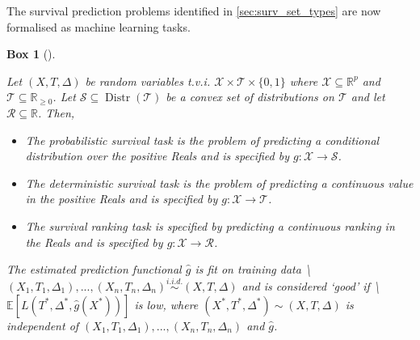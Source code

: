 \documentclass[
  letterpaper,
]{scrbook}
\providecommand{\tightlist}{%
  \setlength{\itemsep}{0pt}\setlength{\parskip}{0pt}}\usepackage{longtable,booktabs,array}
\theoremstyle{plain}
\newtheorem{conjecture}{Box}[chapter]
\theoremstyle{definition}
\theoremstyle{remark}
\begin{document}
The survival prediction problems identified in \ref{sec:surv_set_types}
are now formalised as machine learning tasks.

\begin{tcolorbox}[enhanced jigsaw, title={Survival Task}, breakable, leftrule=.75mm, rightrule=.15mm, opacityback=0, coltitle=black, colback=white, toptitle=1mm, toprule=.15mm, bottomtitle=1mm, titlerule=0mm, arc=.35mm, bottomrule=.15mm, colbacktitle=quarto-callout-note-color!10!white, left=2mm, opacitybacktitle=0.6, colframe=quarto-callout-note-color-frame]

\leavevmode{}%
\begin{conjecture}[]\label{cnj-task-surv}

Let \((X,T,\Delta)\) be random variables t.v.i.
\(\mathcal{X}\times \mathcal{T}\times \{0,1\}\) where
\(\mathcal{X}\subseteq \mathbb{R}^p\) and
\(\mathcal{T}\subseteq \mathbb{R}_{\geq 0}\). Let
\(\mathcal{S}\subseteq \ensuremath{\operatorname{Distr}(\mathcal{T})}\)
be a convex set of distributions on \(\mathcal{T}\) and let
\(\mathcal{R}\subseteq \mathbb{R}\). Then,

\begin{itemize}
\tightlist
\item
  The \emph{probabilistic survival task} is the problem of predicting a
  conditional distribution over the positive Reals and is specified by
  \(g: \mathcal{X}\rightarrow \mathcal{S}\).
\item
  The \emph{deterministic survival task} is the problem of predicting a
  continuous value in the positive Reals and is specified by
  \(g: \mathcal{X}\rightarrow \mathcal{T}\).
\item
  The \emph{survival ranking task} is specified by predicting a
  continuous ranking in the Reals and is specified by
  \(g: \mathcal{X}\rightarrow \mathcal{R}\).
\end{itemize}

The estimated prediction functional \(\hat{g}\) is fit on training data
\textbackslash{}\((X_1,T_1,\Delta_1),...,(X_n,T_n,\Delta_n) \stackrel{i.i.d.}\sim(X,T,\Delta)\)
and is considered `good' if
\textbackslash{}\(\mathbb{E}[L(T^*, \Delta^*, \hat{g}(X^*))]\) is low,
where \((X^*, T^*, \Delta^*) \sim (X, T, \Delta)\) is independent of
\((X_1,T_1,\Delta_1),...,(X_n,T_n,\Delta_n)\) and \(\hat{g}\).

\end{conjecture}

\end{tcolorbox}
\end{document}
